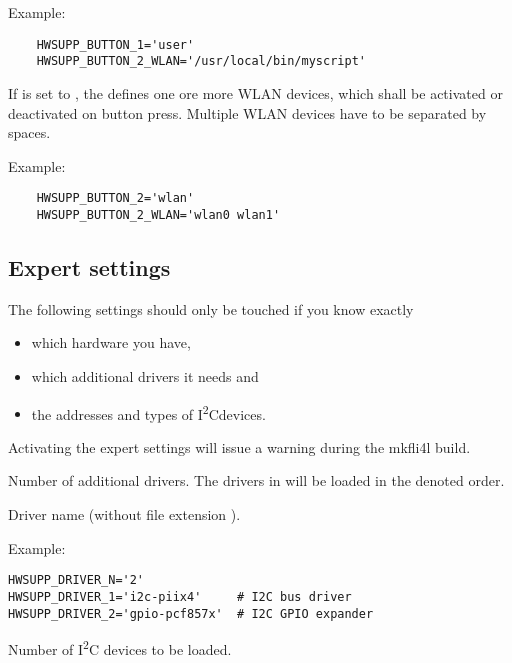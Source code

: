 \begin{description}
  Example:
  \begin{verbatim}
    HWSUPP_BUTTON_1='user'
    HWSUPP_BUTTON_2_WLAN='/usr/local/bin/myscript'
  \end{verbatim}

  If   is set to , the 
   defines one ore more WLAN devices, 
  which shall be activated or deactivated on  button press.
  Multiple WLAN devices have to be separated by spaces.
  
  Example:
  \begin{verbatim}
    HWSUPP_BUTTON_2='wlan'
    HWSUPP_BUTTON_2_WLAN='wlan0 wlan1'
  \end{verbatim}

\subsection{Expert settings}
  The following settings should only be touched if you know exactly
  \begin{itemize}
    \item which hardware you have,
    \item which additional drivers it needs and
    \item the addresses and types of I\textsuperscript{2}C\footnotemark  devices.

  \end{itemize}
  Activating the expert settings will issue a warning during the mkfli4l build.

  Number of additional drivers.
  The drivers in  will be loaded in the denoted order.

  Driver name (without file extension ).

Example:
\begin{verbatim}
HWSUPP_DRIVER_N='2'
HWSUPP_DRIVER_1='i2c-piix4'     # I2C bus driver
HWSUPP_DRIVER_2='gpio-pcf857x'  # I2C GPIO expander
\end{verbatim}

  Number of I\textsuperscript{2}C devices to be loaded.


\end{description}
